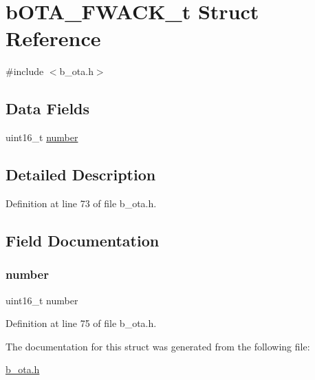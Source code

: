 \hypertarget{structb_o_t_a___f_w_a_c_k__t}{}\section{b\+O\+T\+A\+\_\+\+F\+W\+A\+C\+K\+\_\+t Struct Reference}
\label{structb_o_t_a___f_w_a_c_k__t}


{\ttfamily \#include $<$b\+\_\+ota.\+h$>$}

\subsection*{Data Fields}
\begin{DoxyCompactItemize}
\item 
uint16\+\_\+t \mbox{\hyperlink{structb_o_t_a___f_w_a_c_k__t_adf69c46b3dd2878c66bab78eddc40b04}{number}}
\end{DoxyCompactItemize}


\subsection{Detailed Description}


Definition at line 73 of file b\+\_\+ota.\+h.



\subsection{Field Documentation}
\mbox{\label{structb_o_t_a___f_w_a_c_k__t_adf69c46b3dd2878c66bab78eddc40b04}} 
\subsubsection{\texorpdfstring{number}{number}}
{\footnotesize\ttfamily uint16\+\_\+t number}



Definition at line 75 of file b\+\_\+ota.\+h.



The documentation for this struct was generated from the following file\+:\begin{DoxyCompactItemize}
\item 
\mbox{\hyperlink{b__ota_8h}{b\+\_\+ota.\+h}}\end{DoxyCompactItemize}
